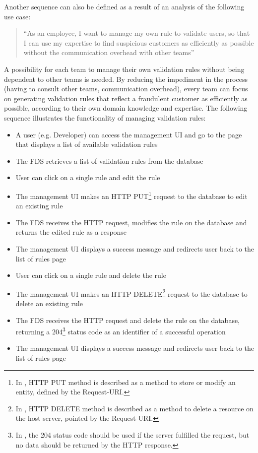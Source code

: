 Another sequence can also be defined as a result of an analysis of the following use case:

\begin{quotation}
 \enquote{As an employee, I want to manage my own rule to validate users, so that I can use my expertise to find suspicious customers as efficiently as possible without the communication overhead with other teams} 
\end{quotation}

A possibility for each team to manage their own validation rules without being dependent to other teams is needed. By reducing the impediment in the process (having to consult other teams, communication overhead), every team can focus on generating validation rules that reflect a fraudulent customer as efficiently as possible, according to their own domain knowledge and expertise. The following sequence illustrates the functionality of managing validation rules:

\begin{itemize}
 \item A user (e.g. Developer) can access the management UI and go to the page that displays a list of available validation rules
 \item The FDS retrieves a list of validation rules from the database
 \item User can click on a single rule and edit the rule
 \item The management UI makes an HTTP PUT\footnote{In \autocite[\enquote{9.6 PUT}]{http-rfc}, HTTP PUT method is described as a method to store or modify an entity, defined by the Request-URI.} request to the database to edit an existing rule
 \item The FDS receives the HTTP request, modifies the rule on the database and returns the edited rule as a response
 \item The management UI displays a success message and redirects user back to the list of rules page
 \item User can click on a single rule and delete the rule
 \item The management UI makes an HTTP DELETE\footnote{In \autocite[\enquote{9.7 DELETE}]{http-rfc}, HTTP DELETE method is described as a method to delete a resource on the host server, pointed by the Request-URI.} request to the database to delete an existing rule
 \item The FDS receives the HTTP request and delete the rule on the database, returning a 204\footnote{In \autocite[\enquote{10.2.5 204 No Content}]{http-rfc}, the 204 status code should be used if the server fulfilled the request, but no data should be returned by the HTTP response.} status code as an identifier of a successful operation
 \item The management UI displays a success message and redirects user back to the list of rules page
\end{itemize} 


